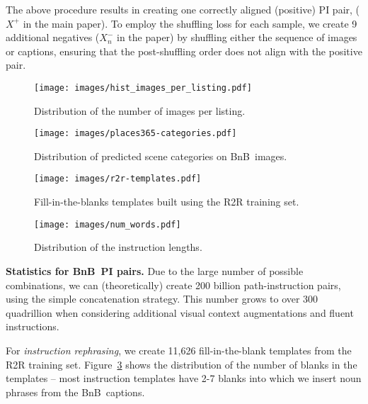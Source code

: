 \RequirePackage[dvipsnames,table]{xcolor} \documentclass[10pt,twocolumn,letterpaper]{article}
\newcommand{\p}[1]{\vspace{1mm}\noindent\textbf{#1}}
\newcommand{\airbnb}{BnB}
\begin{document}
The above procedure results in creating one correctly aligned (positive) PI pair, ($X^+$ in the main paper).
To employ the shuffling loss for each sample, we create 9 additional negatives ($X^-_n$ in the paper) by shuffling either the sequence of images or captions, ensuring that the post-shuffling order does not align with the positive pair.

\begin{figure*}[t]
    \centering
    \begin{subfigure}[b]{0.47\textwidth}
        \centering
        \texttt{[image: images/hist\_images\_per\_listing.pdf]}
        \caption{Distribution of the number of images per listing.}
        \label{fig:imgs_per_listing}
    \end{subfigure}
    \hfill
    \begin{subfigure}[b]{0.47\textwidth}
        \centering
        \texttt{[image: images/places365-categories.pdf]}
        \caption{Distribution of predicted scene categories on \airbnb~images.}
        \label{fig:img_categories}
    \end{subfigure}
    \hfill
    \begin{subfigure}[b]{0.47\textwidth}
        \centering
        \texttt{[image: images/r2r-templates.pdf]}
        \caption{Fill-in-the-blanks templates built using the R2R training set.}
        \label{fig:fillin-templates}
    \end{subfigure}
    \hfill
    \begin{subfigure}[b]{0.47\textwidth}
         \centering
         \texttt{[image: images/num\_words.pdf]}
         \caption{Distribution of the instruction lengths.}
         \label{fig:words_in_caption}
     \end{subfigure}
    \caption{Statistics of \airbnb~Dataset.}
    \label{fig:statistics}
\end{figure*}


\p{Statistics for \airbnb~PI pairs.}
Due to the large number of possible combinations, we can (theoretically) create 200 billion path-instruction pairs, using the simple concatenation strategy.
This number grows to over 300 quadrillion when considering additional visual context augmentations and fluent instructions.

For \emph{instruction rephrasing}, we create 11,626 fill-in-the-blank templates from the R2R training set.
Figure~\ref{fig:fillin-templates} shows the distribution of the number of blanks in the templates -- most instruction templates have 2-7 blanks into which we insert noun phrases from the \airbnb~captions.
\end{document}
